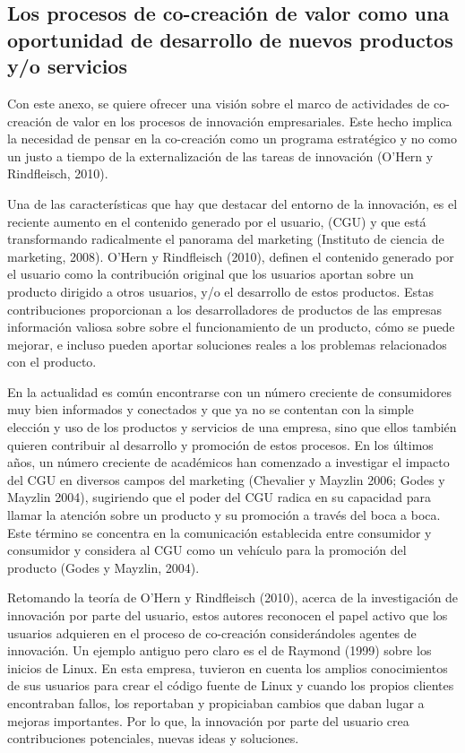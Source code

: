 \subsection*{Los procesos de co-creación de valor como una oportunidad de desarrollo de nuevos productos y/o servicios}


Con este anexo, se quiere ofrecer una visión sobre el marco de actividades de co-creación de valor en los procesos de innovación empresariales. Este hecho implica la necesidad de pensar en la co-creación como un programa estratégico y no como un justo a tiempo de la externalización de las tareas de innovación (O'Hern y Rindfleisch, 2010).

Una de las características que hay que destacar del entorno de la innovación, es el reciente aumento en el contenido generado por el usuario, (CGU) y que está transformando radicalmente el panorama del marketing (Instituto de ciencia de marketing, 2008). O'Hern y Rindfleisch (2010), definen el contenido generado por el usuario como la contribución original que los usuarios aportan sobre un producto dirigido a otros usuarios, y/o el desarrollo de estos productos. Estas contribuciones proporcionan a los desarrolladores de productos de las empresas información valiosa sobre sobre el funcionamiento de un producto, cómo se puede mejorar, e incluso pueden aportar soluciones reales a los problemas relacionados con el producto.

En la actualidad es común encontrarse con un número creciente de consumidores muy bien informados y conectados y que ya no se contentan con la simple elección y uso de los productos y servicios de una empresa, sino que ellos también quieren contribuir al desarrollo y promoción de estos procesos. En los últimos años, un número creciente de académicos han comenzado a investigar el impacto del CGU en diversos campos del marketing (Chevalier y Mayzlin 2006; Godes y Mayzlin 2004), sugiriendo que el poder del CGU radica en su capacidad para llamar la atención sobre un producto y su promoción a través del boca a boca. Este término se concentra en la comunicación establecida entre consumidor y consumidor y considera al CGU como un vehículo para la promoción del producto (Godes y Mayzlin, 2004).

Retomando la teoría de O'Hern y Rindfleisch (2010), acerca de la investigación de innovación por parte del usuario, estos autores reconocen el papel activo que los usuarios adquieren en el proceso de co-creación considerándoles agentes de innovación. Un ejemplo antiguo pero claro es el de Raymond (1999) sobre los inicios de Linux. En esta empresa, tuvieron en cuenta los amplios conocimientos de sus usuarios para crear el código fuente de Linux y cuando los propios clientes encontraban fallos, los reportaban y propiciaban cambios que daban lugar a mejoras importantes. Por lo que, la innovación por parte del usuario crea contribuciones potenciales, nuevas ideas y soluciones.

